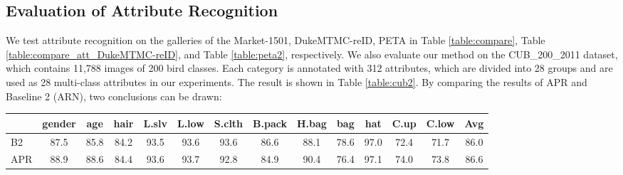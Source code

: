 \documentclass[5p,times,twocolumn]{elsarticle}
\begin{document}
\subsection{Evaluation of Attribute Recognition}\label{sec:eva_attribute}

We test attribute recognition on the galleries of the Market-1501, DukeMTMC-reID, PETA in Table \ref{table:compare}, Table \ref{table:compare_att_DukeMTMC-reID}, and Table \ref{table:peta2}, respectively. 
We also evaluate our method on the CUB\_200\_2011 dataset, which contains 11,788 images of 200 bird classes. Each category is annotated with 312 attributes, which are divided into 28 groups and are used as 28 multi-class attributes in our experiments. The result is shown in Table \ref{table:cub2}. By comparing the results of APR and Baseline 2 (ARN), two conclusions can be drawn:
    
    \setlength{\tabcolsep}{2.75pt}
    \begin{table*}[!t]
    	\small
\caption{Attribute recognition accuracy on Market-1501. In ``APR'', parameter  is optimized in Fig. \ref{fig:parameter}. ``L.slv'', ``L.low'', ``S.clth'', ``B.pack'', ``H.bag'', ``C.up'', ``C.low'' denote \emph{length of sleeve}, \emph{length of lower-body clothing}, \emph{style of clothing}, \emph{backpack}, \emph{handbag}, \emph{color of upper-body clothing} and \emph{color of lower-body clothing}, \emph{resp}. ``B2'' denotes Baseline~2 (ARN).}
\begin{center}
            \begin{tabular}{l|cccccccccccc|c}
                \hline
                &gender & age&hair &L.slv& L.low &S.clth&B.pack&H.bag&bag&hat&C.up&C.low& Avg\\
                \hline
                B2 &87.5&85.8&84.2&93.5&93.6&93.6&86.6&88.1&78.6&97.0&72.4 &71.7 &86.0\\
                APR&88.9&88.6&84.4&93.6&93.7&92.8&84.9&90.4&76.4&97.1& 74.0&73.8 &86.6\\
                \hline
            \end{tabular}
            \label{table:compare}
        \end{center}
    \end{table*}
    
\end{document}
